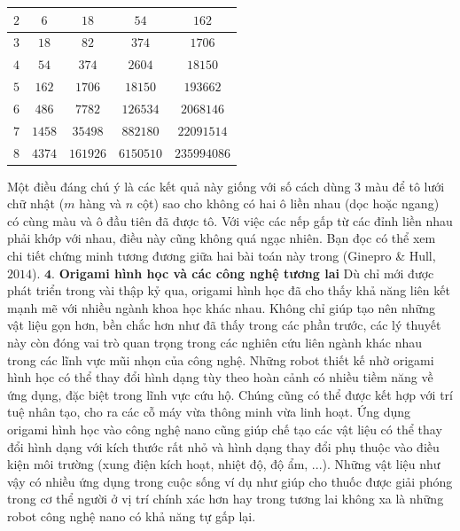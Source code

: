 \begin{multicols}{2}
\begin{table}[H]
{\begin{tabular}{|c|c|c|c|c|}
			\hline
			$2$ & $6$ & $18$ & $54$ & $162$\\
			\hline
			$3$ & $18$ & $82$ & $374$ & $1706$\\
			\hline
			$4$ & $54$ & $374$ & $2604$ & $18150$\\
			\hline
			$5$ & $162$ & $1706$ & $18150$ & $193662$\\
			\hline
			$6$ & $486$ & $7782$ & $126534$ & $2068146$\\
			\hline
			$7$ & $1458$& $35498$ & $882180$& $22091514$\\
			\hline
			$8$ & $4374$ & $161926$ & $6150510$ & $235994086$\\
			\hline
		\end{tabular}}
	\end{table}
	Một điều đáng chú ý là các kết quả này giống với số cách dùng $3$ màu để tô lưới chữ nhật ($m$ hàng và $n$ cột) sao cho không có hai ô liền nhau (dọc hoặc ngang) có cùng màu và ô đầu tiên đã được tô. Với việc các nếp gấp từ các đỉnh liền nhau phải khớp với nhau, điều này cũng không quá ngạc nhiên. Bạn đọc có thể xem chi tiết chứng minh tương đương giữa hai bài toán này trong (Ginepro \& Hull, $2014$).
	\vskip 0.05cm
	$\pmb{4.}$ \textbf{\color{toanhocdoisong}Origami hình học và các công nghệ tương lai}
	\vskip 0.05cm
	Dù chỉ mới được phát triển trong vài thập kỷ qua, origami hình học đã cho thấy khả năng liên kết mạnh mẽ với nhiều ngành khoa học khác nhau. Không chỉ giúp tạo nên những vật liệu gọn hơn, bền chắc hơn như đã thấy trong các phần trước, các lý thuyết này còn đóng vai trò quan trọng trong các nghiên cứu liên ngành khác nhau trong các lĩnh vực mũi nhọn của công nghệ.
	\vskip 0.1cm
	Những robot thiết kế nhờ origami hình học có thể thay đổi hình dạng tùy theo hoàn \linebreak cảnh có nhiều tiềm năng về ứng dụng, đặc biệt trong lĩnh vực cứu hộ. Chúng cũng có thể được kết hợp với trí tuệ nhân tạo, cho ra các cỗ máy vừa thông minh vừa linh hoạt.
	\vskip 0.05cm
	Ứng dụng origami hình học vào công nghệ nano cũng giúp chế tạo các vật liệu có thể thay đổi hình dạng với kích thước rất nhỏ và hình dạng thay đổi phụ thuộc vào điều kiện môi trường (xung điện kích hoạt, nhiệt độ, độ ẩm, ...). Những vật liệu như vậy có nhiều ứng dụng trong cuộc sống  ví dụ như giúp cho thuốc được giải phóng trong cơ thể người ở vị trí chính xác hơn hay trong tương lai không xa là những robot công nghệ nano có khả năng tự gấp lại.
	\begin{figure}[H]
		\vspace*{-5pt}
		\centering
		\captionsetup{labelformat= empty, justification=centering}

\end{figure}
\end{multicols}
